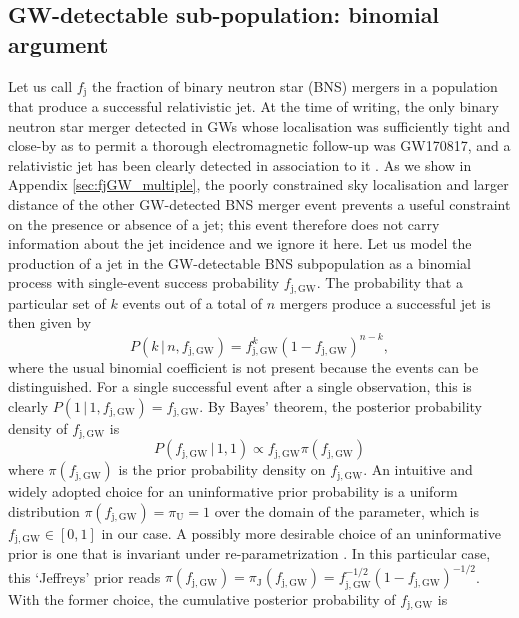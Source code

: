 \documentclass[]{aa}
\newcommand{\resp}[1]{#1}
\begin{document}
\subsection{GW-detectable sub-population: binomial argument}\label{sec:fjet_GW}
Let us call $f_\mathrm{j}$ the fraction of binary neutron star (BNS) mergers in a population that produce a successful relativistic jet.  At the time of writing, the only binary neutron star merger detected in GWs whose localisation was sufficiently tight and close-by as to permit a thorough electromagnetic follow-up was GW170817, and a relativistic jet has been clearly detected \resp{in association to it} \citep{Abbot2017_GW170817_GRB170817A,Mooley2018,Ghirlanda2019}. \resp{As we show in Appendix \ref{sec:fjGW_multiple}, the poorly constrained sky localisation and larger distance of the other GW-detected BNS merger event \citep[GW190425, ][]{Abbott2020_GW190425} prevents a useful constraint on the presence or absence of a jet; this event therefore does not carry information about the jet incidence and we ignore it here.} Let us model the production of a jet in the GW-detectable BNS subpopulation as a binomial process with single-event success probability $f_\mathrm{j,GW}$. The probability that a particular set of $k$ events out of a total of $n$ mergers produce a successful jet is then given by \begin{equation}
 P(k\,|\,n,f_\mathrm{j,GW})=f_\mathrm{j,GW}^k(1-f_\mathrm{j,GW})^{n-k},
 \label{eq:fjGWlikelihood}
\end{equation}
where the usual binomial coefficient is not present because the events can be distinguished.
For a single successful event after a single observation,
this is clearly $P(1\,|\,1,f_\mathrm{j,GW})=f_\mathrm{j,GW}$. By Bayes' theorem, the posterior probability density of $f_\mathrm{j,GW}$ is
\begin{equation}
 P(f_\mathrm{j,GW}\,|\,1,1) \propto f_\mathrm{j,GW} \pi(f_\mathrm{j,GW})
 \label{eq:fjGWposterior}
\end{equation}
where $\pi(f_\mathrm{j,GW})$ is the prior probability density on $f_\mathrm{j,GW}$. An intuitive and widely adopted choice for an uninformative prior probability is a uniform distribution $\pi(f_\mathrm{j,GW})=\pi_\mathrm{U}=1$ over the domain of the parameter, which is $f_\mathrm{j,GW}\in [0,1]$ in our case. A possibly more desirable choice \resp{of an uninformative prior is one that is invariant under re-parametrization} \citep{Jeffreys1946}. In this particular case, \resp{this `Jeffreys' prior} reads $\pi(f_\mathrm{j,GW})=\pi_\mathrm{J}(f_\mathrm{j,GW})=f_\mathrm{j,GW}^{-1/2}(1-f_\mathrm{j,GW})^{-1/2}$. With the former choice, the cumulative posterior probability of $f_\mathrm{j,GW}$ is 
\end{document}
